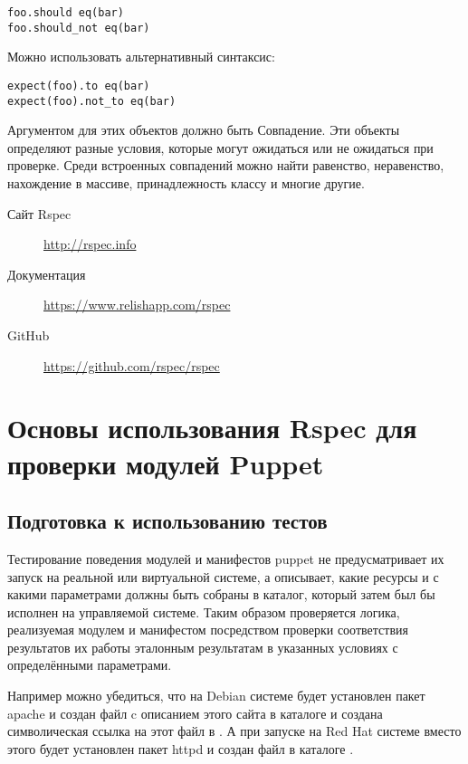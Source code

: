 \begin{verbatim}
foo.should eq(bar)
foo.should_not eq(bar)
\end{verbatim}

Можно использовать альтернативный синтаксис:

\begin{verbatim}
expect(foo).to eq(bar)
expect(foo).not_to eq(bar) 
\end{verbatim}

Аргументом для этих объектов должно быть Совпадение. Эти объекты определяют разные условия, которые могут ожидаться или не ожидаться при проверке. Среди встроенных совпадений можно найти равенство, неравенство, нахождение в массиве, принадлежность классу и многие другие.

\begin{description}
\item[Сайт Rspec] \url{http://rspec.info}
\item[Документация] \url{https://www.relishapp.com/rspec}
\item[GitHub] \url{https://github.com/rspec/rspec}
\end{description}


\section{Основы использования Rspec для проверки модулей Puppet}

\subsection{Подготовка к использованию тестов}

Тестирование поведения модулей и манифестов puppet не предусматривает их запуск на реальной или виртуальной системе, а описывает, какие ресурсы и с какими параметрами должны быть собраны в каталог, который затем был бы исполнен на управляемой системе. Таким образом проверяется логика, реализуемая модулем и манифестом посредством проверки соответствия результатов их работы эталонным результатам в указанных условиях с определёнными параметрами.

Например можно убедиться, что на Debian системе будет установлен пакет apache и создан файл  c описанием этого сайта в каталоге   и создана символическая ссылка на этот файл в . А при запуске на Red Hat системе вместо этого будет установлен пакет httpd и создан файл  в каталоге .

